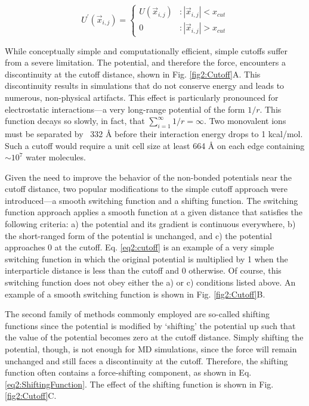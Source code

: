 \begin{equation}
   U^{\prime}(\vec{x}_{i,j}) = \left \{
   \begin{array}{lr}
      U(\vec{x}_{i,j}) & : \left | \vec{x}_{i,j} \right | < x_{cut} \\
      0 & : \left | \vec{x}_{i,j} \right | > x_{cut}
   \end{array}
   \right.
   \label{eq2:cutoff}
\end{equation}

While conceptually simple and computationally efficient, simple cutoffs suffer
from a severe limitation. The potential, and therefore the force, encounters a
discontinuity at the cutoff distance, shown in Fig.
\ref{fig2:Cutoff}A. This discontinuity results in simulations that do not
conserve energy and leads to numerous, non-physical artifacts.
\cite{Schreiber_JMolBiol_1992_v228_p909, Schreiber_Biochemistry_1992_v31_p5856,
Saito_JChemPhys_1994_v101_p4055, Auffinger_ChemPhysLett_1995_v234_p413,
Cheatham_JAmChemSoc_1995_v117_p4193, Feller_JPhysChem_1996_v100_p17011,
Patra_BiophysJ_2003_v84_p3636} This effect is particularly pronounced for
electrostatic interactions---a very long-range potential of the form $1/r$. This
function decays so slowly, in fact, that $\sum_{i=1}^{\infty} 1/r = \infty$.
Two monovalent ions must be separated by ~332 {\AA} before their interaction
energy drops to 1 kcal/mol. Such a cutoff would require a unit cell size at
least 664 {\AA} on each edge containing $\sim 10^7$ water molecules.

Given the need to improve the behavior of the non-bonded potentials near the
cutoff distance, two popular modifications to the simple cutoff approach were
introduced---a smooth switching function and a shifting function. The switching
function approach applies a smooth function at a given distance that satisfies
the following criteria: a) the potential and its gradient is continuous
everywhere, b) the short-ranged form of the potential is unchanged, and c) the
potential approaches 0 at the cutoff. Eq. \ref{eq2:cutoff} is an example of a
very simple switching function in which the original potential is multiplied by
1 when the interparticle distance is less than the cutoff and 0 otherwise. Of
course, this switching function does not obey either the a) or c) conditions
listed above. An example of a smooth switching function is shown in Fig.
\ref{fig2:Cutoff}B. \cite{Steinbach_JComputChem_1994_v15_p667}

The second family of methods commonly employed are so-called shifting functions
since the potential is modified by `shifting' the potential up such that the
value of the potential becomes zero at the cutoff distance.
\cite{Steinbach_JComputChem_1994_v15_p667, Allen_Tildesley} Simply shifting the
potential, though, is not enough for MD simulations, since the force will remain
unchanged and still faces a discontinuity at the cutoff. Therefore, the shifting
function often contains a force-shifting component, as shown in Eq.
\ref{eq2:ShiftingFunction}. \cite{Allen_Tildesley} The effect of the shifting
function is shown in Fig. \ref{fig2:Cutoff}C.

